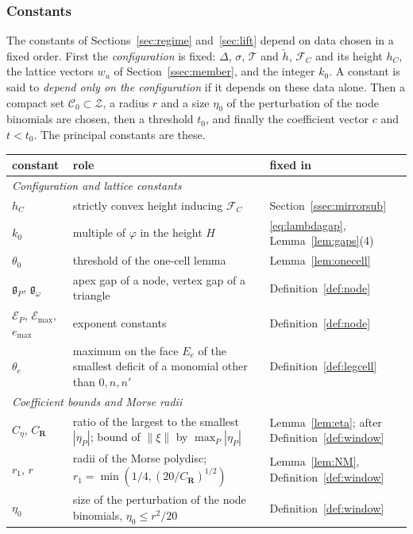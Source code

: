 \subsubsection*{Constants}
The constants of Sections~\ref{sec:regime} and~\ref{sec:lift} depend on data chosen in a fixed order. First the
\emph{configuration} is fixed: $\Delta$, $\sigma$, $\mathcal T$ and $\check h$, $\mathcal F_C$ and its height $h_C$, the
lattice vectors $w_u$ of Section~\ref{ssec:member}, and the integer $k_0$. A constant is said to \emph{depend only on the
configuration} if it depends on these data alone. Then a compact set $\mathscr C_0\subset\mathcal Z$, a radius $r$ and
a size $\eta_0$ of the perturbation of the node binomials are chosen, then a threshold $t_0$, and finally the
coefficient vector $c$ and $t<t_0$. The principal constants are these.
\begin{center}\small
\begin{tabular}{p{2.4cm}p{7.4cm}p{4.6cm}}
constant & role & fixed in\\\hline
\multicolumn{3}{l}{\emph{Configuration and lattice constants}}\\
$h_C$ & strictly convex height inducing $\mathcal F_C$ & Section~\ref{ssec:mirrorsub}\\
$k_0$ & multiple of $\varphi$ in the height $H$ & \eqref{eq:lambdagap}, Lemma~\ref{lem:gaps}(4)\\
$\theta_0$ & threshold of the one-cell lemma & Lemma~\ref{lem:onecell}\\
$\mathfrak g_P$, $\mathfrak g_\omega$ & apex gap of a node, vertex gap of a triangle & Definition~\ref{def:node}\\
$\mathcal E_P$, $\mathcal E_{\max}$, $e_{\max}$ & exponent constants & Definition~\ref{def:node}\\
$\theta_e$ & maximum on the face $E_e$ of the smallest deficit of a monomial other than $0,n,n'$ & Definition~\ref{def:legcell}\\
\multicolumn{3}{l}{\emph{Coefficient bounds and Morse radii}}\\
$C_\eta$, $C_{\mathbf R}$ & ratio of the largest to the smallest $|\eta_P|$; bound of $\|\xi\|$ by $\max_P|\eta_P|$ &
Lemma~\ref{lem:eta}; after Definition~\ref{def:window}\\
$r_1$, $r$ & radii of the Morse polydisc; $r_1=\min(1/4,(20/C_{\mathbf R})^{1/2})$ & Lemma~\ref{lem:NM}, Definition~\ref{def:window}\\
$\eta_0$ & size of the perturbation of the node binomials, $\eta_0\le r^2/20$ & Definition~\ref{def:window}\\

\end{tabular}
\end{center}
